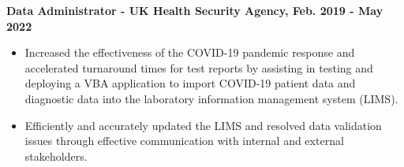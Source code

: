 \documentclass[10pt,a4paper]{article}
\begin{document}
\noindent \bf Data Administrator - UK Health Security Agency, Feb. 2019 - May 2022

\begin{itemize}[leftmargin=*,align=left]
\normalfont
\item Increased the effectiveness of the COVID-19 pandemic response and accelerated turnaround times for test reports by assisting in testing and deploying a VBA application to import COVID-19 patient data and diagnostic data into the laboratory information management system (LIMS).
\item Efficiently and accurately updated the LIMS and resolved data validation issues through effective communication with internal and external stakeholders.
\end{itemize}
\end{document}

